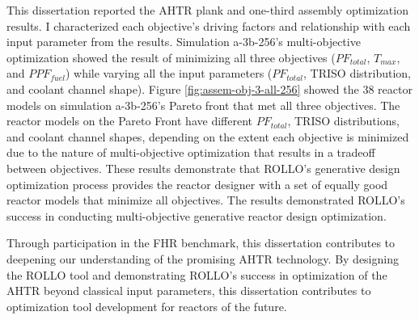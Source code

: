 This dissertation reported the \gls{AHTR} plank and one-third assembly optimization 
results. 
I characterized each objective's driving factors and relationship with each input 
parameter from the results. 
Simulation a-3b-256's multi-objective optimization showed the result of minimizing all 
three objectives ($PF_{total}$, $T_{max}$, and $PPF_{fuel}$) while varying 
all the input parameters ($PF_{total}$, TRISO distribution, and coolant channel shape).
Figure \ref{fig:assem-obj-3-all-256} showed the 38 reactor models on simulation 
a-3b-256's Pareto front that met all three objectives. 
The reactor models on the Pareto Front have different $PF_{total}$, TRISO distributions, 
and coolant channel shapes, depending on the extent each objective is minimized due 
to the nature of multi-objective optimization that results in a tradeoff between 
objectives. 
These results demonstrate that \gls{ROLLO}'s generative design optimization process 
provides the reactor designer with a set of equally good reactor models that minimize 
all objectives.
The results demonstrated \gls{ROLLO}'s success in conducting multi-objective generative 
reactor design optimization. 

Through participation in the \gls{FHR} benchmark, this dissertation contributes to 
deepening our understanding of the promising \gls{AHTR} technology. 
By designing the \gls{ROLLO} tool and demonstrating \gls{ROLLO}'s success in 
optimization of the \gls{AHTR} beyond classical input parameters, this dissertation 
contributes to optimization tool development for reactors of the future. 